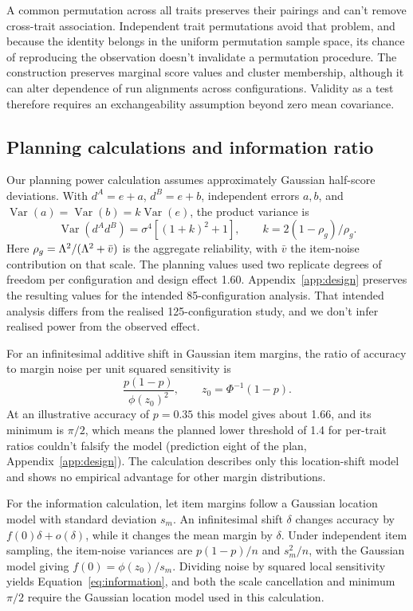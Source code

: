 A common permutation across all traits preserves their pairings and can't remove cross-trait association. Independent trait permutations avoid that problem, and because the identity belongs in the uniform permutation sample space, its chance of reproducing the observation doesn't invalidate a permutation procedure. The construction preserves marginal score values and cluster membership, although it can alter dependence of run alignments across configurations. Validity as a test therefore requires an exchangeability assumption beyond zero mean covariance.

\subsection{Planning calculations and information ratio}
Our planning power calculation assumes approximately Gaussian half-score deviations. With $d^A=e+a$, $d^B=e+b$, independent errors $a,b$, and $\operatorname{Var}(a)=\operatorname{Var}(b)=k\operatorname{Var}(e)$, the product variance is
\begin{equation}
\operatorname{Var}(d^Ad^B)=\sigma^4[(1+k)^2+1],\qquad
k=2(1-\rho_g)/\rho_g.
\end{equation}
Here $\rho_g=\Lambda^2/(\Lambda^2+\bar v)$ is the aggregate reliability, with $\bar v$ the item-noise contribution on that scale. The planning values used two replicate degrees of freedom per configuration and design effect 1.60. Appendix~\ref{app:design} preserves the resulting values for the intended 85-configuration analysis. That intended analysis differs from the realised 125-configuration study, and we don't infer realised power from the observed effect.

For an infinitesimal additive shift in Gaussian item margins, the ratio of accuracy to margin noise per unit squared sensitivity is
\begin{equation}
\frac{p(1-p)}{\phi(z_0)^2},\qquad z_0=\Phi^{-1}(1-p).
\label{eq:information}
\end{equation}
At an illustrative accuracy of $p=0.35$ this model gives about 1.66, and its minimum is $\pi/2$, which means the planned lower threshold of 1.4 for per-trait ratios couldn't falsify the model (prediction eight of the plan, Appendix~\ref{app:design}). The calculation describes only this location-shift model and shows no empirical advantage for other margin distributions.

For the information calculation, let item margins follow a Gaussian location model with standard deviation $s_m$. An infinitesimal shift $\delta$ changes accuracy by $f(0)\delta+o(\delta)$, while it changes the mean margin by $\delta$. Under independent item sampling, the item-noise variances are $p(1-p)/n$ and $s_m^2/n$, with the Gaussian model giving $f(0)=\phi(z_0)/s_m$. Dividing noise by squared local sensitivity yields Equation~\ref{eq:information}, and both the scale cancellation and minimum $\pi/2$ require the Gaussian location model used in this calculation.

